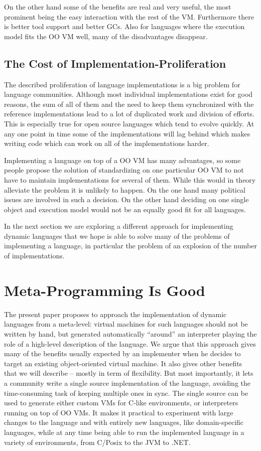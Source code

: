 \documentclass{llncs}
\begin{document}
On the other hand some of the benefits are real and very useful, the most
prominent being the easy interaction with the rest of the VM. Furthermore there
is better tool support and better GCs. Also for languages where the execution
model fits the OO VM well, many of the disadvantages disappear.


\subsection{The Cost of Implementation-Proliferation}

The described proliferation of language implementations is a big problem for
language communities. Although most individual implementations exist for good
reasons, the sum of all of them and the need to keep them synchronized with the
reference implementations lead to a lot of duplicated work and division of
efforts. This is especially true for open source languages which tend to evolve
quickly. At any one point in time some of the implementations will lag behind
which makes writing code which can work on all of the implementations harder.

Implementing a language on top of a OO VM has many advantages, so some
people propose the solution of standardizing on one particular OO VM to not have
to maintain implementations for several of them. While this would in theory
alleviate the problem it is unlikely to happen. On the one hand many political
issues are involved in such a decision. On the other hand deciding on one single
object and execution model would not be an equally good fit for all languages.

In the next section we are exploring a different approach for implementing
dynamic languages that we hope is able to solve many of the problems of
implementing a language, in particular the problem of an explosion of the number
of implementations.

\section{Meta-Programming Is Good}
\label{sect:metaprogramming}

The present paper proposes to approach the implementation of dynamic
languages from a meta-level: virtual machines for such languages should
not be written by hand, but generated automatically ``around'' an
interpreter playing the role of a high-level description of the language.  We
argue that this approach gives many of the benefits usually expected by
an implementer when he decides to target an existing object-oriented
virtual machine.  It also gives other benefits that we will describe --
mostly in term of flexibility.  But most importantly, it lets a
community write a single source implementation of the language, avoiding
the time-consuming task of keeping multiple ones in sync.  The single
source can be used to generate either custom VMs for C-like
environments, or interpreters running on top of OO VMs.  It makes it
practical to experiment with large changes to the language and with
entirely new languages, like domain-specific languages, while at any
time being able to run the implemented language in a variety of
environments, from C/Posix to the JVM to .NET.
\end{document}
